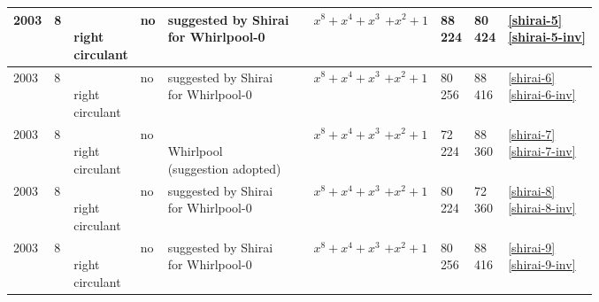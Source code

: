 \begin{footnotesize}
\begin{longtable}[c]{|l|l|l|l|l|l|l|l|l|l|}
2003 & 8 & \shortstack{\\ right \\ circulant} & no & \shortstack{suggested by Shirai \\ for Whirlpool-0} & \cite{Shirai2003} & \shortstack{$x^8+x^4+x^3$\\$+x^2+1$} & \shortstack{88\\224} & \shortstack{80\\424} & \shortstack{\eqref{shirai-5}\\\eqref{shirai-5-inv}} \\ \hline
2003 & 8 & \shortstack{\\ right \\ circulant} & no & \shortstack{suggested by Shirai \\ for Whirlpool-0} & \cite{Shirai2003} & \shortstack{$x^8+x^4+x^3$\\$+x^2+1$} & \shortstack{80\\256} & \shortstack{88\\416} & \shortstack{\eqref{shirai-6}\\\eqref{shirai-6-inv}} \\ \hline
2003 & 8 & \shortstack{\\ right \\ circulant} & no & \shortstack{\\ Whirlpool \\ (suggestion adopted)} & \cite{Shirai2003} & \shortstack{$x^8+x^4+x^3$\\$+x^2+1$} & \shortstack{72\\224} & \shortstack{88\\360} & \shortstack{\eqref{shirai-7}\\\eqref{shirai-7-inv}} \\ \hline
2003 & 8 & \shortstack{\\ right \\ circulant} & no & \shortstack{suggested by Shirai \\ for Whirlpool-0} & \cite{Shirai2003} & \shortstack{$x^8+x^4+x^3$\\$+x^2+1$} & \shortstack{80\\224} & \shortstack{72\\360} & \shortstack{\eqref{shirai-8}\\\eqref{shirai-8-inv}} \\ \hline
2003 & 8 & \shortstack{\\ right \\ circulant} & no & \shortstack{suggested by Shirai \\ for Whirlpool-0} & \cite{Shirai2003} & \shortstack{$x^8+x^4+x^3$\\$+x^2+1$} & \shortstack{80\\256} & \shortstack{88\\416} & \shortstack{\eqref{shirai-9}\\\eqref{shirai-9-inv}} \\ \hline

\end{longtable}
\end{footnotesize}
